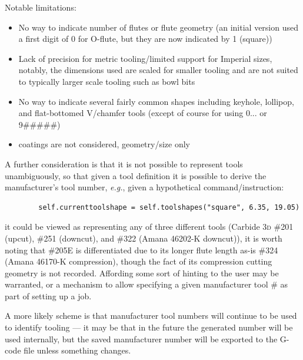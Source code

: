 \documentclass{ltxdoc}
\begin{document}

Notable limitations:

\begin{itemize}
\item No way to indicate number of flutes or flute geometry (an initial version used a first digit of 0 for O-flute, but they are now indicated by 1 (square))
\item Lack of precision for metric tooling/limited support for Imperial sizes, notably, the dimensions used are scaled for smaller tooling and are not suited to typically larger scale tooling such as bowl bits
\item No way to indicate several fairly common shapes including keyhole, lollipop, and flat-bottomed V/chamfer tools (except of course for using 0... or 9\#\#\#\#\#)
\item coatings are not considered, geometry/size only
\end{itemize}

A further consideration is that it is not possible to represent tools unambiguously, so that given a tool definition it is possible to derive the manufacturer's tool number, \emph{e.g.}, given a hypothetical command/instruction:

\begin{verbatim}
        self.currenttoolshape = self.toolshapes("square", 6.35, 19.05)
\end{verbatim}

\noindent it could be viewed as representing any of three different tools (Carbide \textsc{3d} \#201 (upcut), \#251 (downcut), and \#322 (Amana 46202-K downcut)), it is worth noting that \#205E is differentiated due to its longer flute length as-is \#324 (Amana 46170-K compression), though the fact of its compression cutting geometry is not recorded. Affording some sort of hinting to the user may be warranted, or a mechanism to allow specifying a given manufacturer tool \# as part of setting up a job.

A more likely scheme is that manufacturer tool numbers will continue to be used to identify tooling --- it may be that in the future the generated number will be used internally, but the saved manufacturer number will be exported to the G-code file unless something changes.

\end{document}
